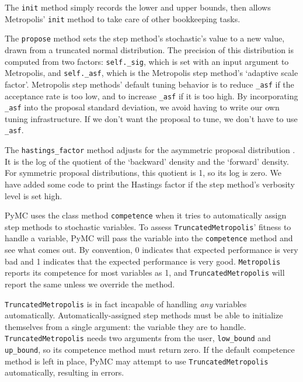 The \texttt{init} method simply records the lower and upper bounds, then allows Metropolis' \texttt{init} method to take care of other bookkeeping tasks. 

The \texttt{propose} method sets the step method's stochastic's value to a new value, drawn from a truncated normal distribution. The precision of this distribution is computed from two factors: \texttt{self._sig}, which is set with an input argument to Metropolis, and \texttt{self._asf}, which is the Metropolis step method's `adaptive scale factor'. Metropolis step methods' default tuning behavior is to reduce \texttt{_asf} if the acceptance rate is too low, and to increase \texttt{_asf} if it is too high. By incorporating \texttt{_asf} into the proposal standard deviation, we avoid having to write our own tuning infrastructure. If we don't want the proposal to tune, we don't have to use \texttt{_asf}.

The \texttt{hastings_factor} method adjusts for the asymmetric proposal distribution \cite{gelman}. It is the log of the quotient of the `backward' density and the `forward' density. For symmetric proposal distributions, this quotient is 1, so its log is zero. We have added some code to print the Hastings factor if the step method's verbosity level is set high.

PyMC uses the class method \texttt{competence} when it tries to automatically assign step methods to stochastic variables. To assess \texttt{TruncatedMetropolis}' fitness to handle a variable, PyMC will pass the variable into the \texttt{competence} method and see what comes out. By convention, 0 indicates that expected performance is very bad and 1 indicates that the expected performance is very good. \texttt{Metropolis} reports its competence for most variables as 1, and \texttt{TruncatedMetropolis} will report the same unless we override the method. 

\texttt{TruncatedMetropolis} is in fact incapable of handling \emph{any} variables automatically. Automatically-assigned step methods must be able to initialize themselves from a single argument: the variable they are to handle. \texttt{TruncatedMetropolis} needs two arguments from the user, \texttt{low_bound} and \texttt{up_bound}, so its competence method must return zero. If the default competence method is left in place, PyMC may attempt to use \texttt{TruncatedMetropolis} automatically, resulting in errors.

